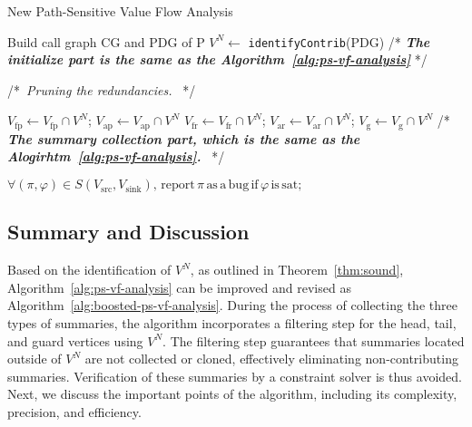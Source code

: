 \begin{algorithm}[t]\small
  \caption{New Path-Sensitive Value Flow Analysis}
  \label{alg:boosted-ps-vf-analysis}
   {
        Build call graph CG and PDG of {P}\;
      $V^{N} \leftarrow $ \texttt{identifyContrib}(PDG)\;
        /* \textbf{\textit{The initialize part is the same as the Algorithm~\ref{alg:ps-vf-analysis}}}  */
        
       {
            /*~\textit{Pruning the redundancies.} ~*/
            
            $V_{\text{fp}} \leftarrow V_{\text{fp}} \cap V^{N}$; $V_{\text{ap}} \leftarrow V_{\text{ap}} \cap V^{N}$\;
            $V_{\text{fr}} \leftarrow V_{\text{fr}} \cap V^{N}$; $V_{\text{ar}} \leftarrow V_{\text{ar}} \cap V^{N}$; $V_{\text{g}} \leftarrow V_{\text{g}} \cap V^{N}$\;
            /* \textbf{\textit{The summary collection part, which is the same as the Alogirhtm~\ref{alg:ps-vf-analysis}.} } ~*/
      }             
    $ \forall (\pi, \varphi) \in S(V_{\text{src}}, V_{\text{sink}}),\, \text{report}\, \pi\, \text{as}\, \text{a}\, \text{bug}\, \text{if}\, \varphi\, \text{is}\, \text{sat;} $
  }
\end{algorithm}

\subsection{Summary and Discussion}
\label{sec:discussion}



Based on the identification of $V^{N}$, as outlined in Theorem~\ref{thm:sound}, Algorithm~\ref{alg:ps-vf-analysis} can be improved and revised as Algorithm~\ref{alg:boosted-ps-vf-analysis}.
During the process of collecting the three types of summaries, the algorithm incorporates a filtering step for the head, tail, and guard vertices using $V^{N}$. 
The filtering step guarantees that summaries located outside of $V^{N}$ are not collected or cloned, effectively eliminating non-contributing summaries. Verification of these summaries by a constraint solver is thus avoided.
Next, we discuss the important points of the algorithm, including its complexity, precision, and efficiency.

